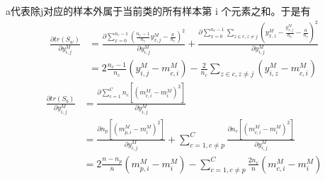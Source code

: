 \documentclass[UTF8]{ctexart}
\begin{document}
a代表除j对应的样本外属于当前类的所有样本第 i 个元素之和。于是有
\begin{equation}
\begin{aligned}
\frac {\partial tr(S_{w})}{\partial y_{i,j}^{M}}&=\frac {\partial \sum_{x=0}^{n_{c}-1}(\frac {n_{c}-1}{n_{c}}y_{x,j}^{M}-\frac {a}{n_c})^{2}}{\partial y_{i,j}^{M}}+\frac {\partial \sum_{x=0}^{n_{c}-1} \sum_{z \in c,z \neq j}(y_{x,z}^{M}-\frac {y_{x,j}^{M}}{n_{c}}-\frac {a}{n_c})^{2}}{\partial y_{i,j}^{M}}\\
&=2 \frac{n_{c}-1}{n_{c}} (y_{i,j}^{M}-m_{c,i}^{M})-\frac{2}{n_{c}} \sum_{z \in c,z \neq j} (y_{i,z}^{M}-m_{c,i}^{M})
\end{aligned}
\end{equation}
\begin{equation}
\begin{aligned}
\frac {\partial tr(S_{b})}{\partial y_{i,j}^{M}}&=\frac {\partial \sum_{c=1}^{C}n_{c}[(m_{c,i}^{M}-m_{i}^{M})^{2}]} {\partial y_{i,j}^{M}}\\
&=\frac {\partial n_{p}[(m_{p,i}^{M}-m_{i}^{M})^{2}]} {\partial y_{i,j}^{M}}+\sum_{c=1,c \neq p}^{C} \frac {\partial n_{c}[(m_{c,i}^{M}-m_{i}^{M})^{2}]} {\partial y_{i,j}^{M}}\\
&=2 \frac{n-n_{p}}{n}(m_{p,i}^{M}-m_{i}^{M})-\sum_{c=1,c \neq p}^{C} \frac {2n_{c}}{n}(m_{c,i}^{M}-m_{i}^{M})
\end{aligned}
\end{equation}
\end{document}
